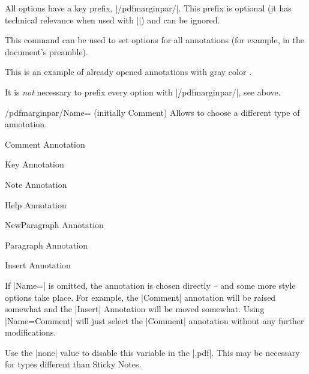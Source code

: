 \documentclass[a4paper]{ltxdoc}
\begin{document}
All options have a key prefix, |/pdfmarginpar/|. This prefix is optional (it has technical relevance when used with |\pgfkeys|) and can be ignored.

\begin{command}{\pdfmarginparset{}}
	This command can be used to set options for all annotations (for example, in the document's preamble). 
\begin{codeexample}[]

This is an example of already opened annotations with gray color
.
\end{codeexample}
	
	It is \emph{not} necessary to prefix every option with |/pdfmarginpar/|, see above.
\end{command}


\begin{key}{/pdfmarginpar/Name= (initially Comment)}
	Allows to choose a different type of annotation.
\begin{codeexample}[] 
Comment Annotation\end{codeexample}
\begin{codeexample}[] 
Key Annotation\end{codeexample}
\begin{codeexample}[]
Note Annotation\end{codeexample}
\begin{codeexample}[]
Help Annotation\end{codeexample}
\begin{codeexample}[]
NewParagraph 
Annotation\end{codeexample}
\begin{codeexample}[]
Paragraph
Annotation\end{codeexample}
\begin{codeexample}[]
Insert Annotation\end{codeexample}

If |Name=| is omitted, the annotation is chosen directly -- and some more style options take place. For example, the |Comment| annotation will be raised somewhat and the |Insert| Annotation will be moved somewhat. Using |Name=Comment| will just select the |Comment| annotation without any further modifications.

Use the |none| value to disable this variable in the |.pdf|. This may be necessary for types different than Sticky Notes.
\end{key}
\end{document}

